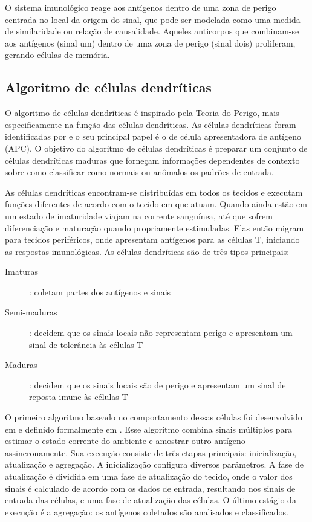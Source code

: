 O sistema imunológico reage aos antígenos dentro de uma zona de perigo centrada no local da origem do sinal, que pode ser modelada como uma medida de similaridade ou relação de causalidade. Aqueles anticorpos que combinam-se aos antígenos (sinal um) dentro de uma zona de perigo (sinal dois) proliferam, gerando células de memória.

\subsection{Algoritmo de células dendríticas}

O algoritmo de células dendríticas é inspirado pela Teoria do Perigo, mais especificamente na função das células dendríticas. As células dendríticas foram identificadas por \citet{Steinman1973} e o seu principal papel é o de célula apresentadora de antígeno (APC). O objetivo do algoritmo de células dendríticas é preparar um conjunto de células dendríticas maduras que forneçam informações dependentes de contexto sobre como classificar como normais ou anômalos os padrões de entrada.

As células dendríticas encontram-se distribuídas em todos os tecidos e executam funções diferentes de acordo com o tecido em que atuam. Quando ainda estão em um estado de imaturidade viajam na corrente sanguínea, até que sofrem diferenciação e maturação quando propriamente estimuladas. Elas então migram para tecidos periféricos, onde apresentam antígenos para as células T, iniciando as respostas imunológicas. As células dendríticas são de três tipos principais:

\begin{description}
    \item[Imaturas]: coletam partes dos antígenos e sinais
    \item[Semi-maduras]: decidem que os sinais locais não representam perigo e apresentam um sinal de tolerância às células T
    \item[Maduras]: decidem que os sinais locais são de perigo e apresentam um sinal de reposta imune às células T
\end{description}

O primeiro algoritmo baseado no comportamento dessas células foi desenvolvido em \citet{Greensmith2005} e definido formalmente em \citet{Greensmith2006}. Esse algoritmo combina sinais múltiplos para estimar o estado corrente do ambiente e amostrar outro antígeno assincronamente. Sua execução consiste de três etapas principais: inicialização, atualização e agregação. A inicialização configura diversos parâmetros. A fase de atualização é dividida em uma fase de atualização do tecido, onde o valor dos sinais é calculado de acordo com os dados de entrada, resultando nos sinais de entrada das células, e uma fase de atualização das células. O último estágio da execução é a agregação: os antígenos coletados são analisados e classificados.

